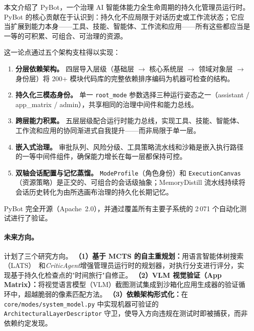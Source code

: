 \documentclass[11pt,a4paper]{article}
\begin{document}
本文介绍了 PyBot，一个治理 AI 智能体能力全生命周期的持久化管理员运行时。
PyBot 的核心贡献在于认识到：持久化不应局限于对话历史或工作流状态；它应当扩展到能力本身——工具、技能、智能体、工作流和应用——所有这些都应当是一等的可积累、可组合、可治理的资源。

这一论点通过五个架构支柱得以实现：

\begin{enumerate}
  \item \textbf{分层依赖架构。}
        四层导入层级（基础层 $\to$ 核心系统层 $\to$ 领域对象层 $\to$ 身份层）将 200+ 模块代码库的完整依赖排序编码为机器可检查的结构。
  \item \textbf{持久化三模态身份。}
        单一 \texttt{root\_mode} 参数选择三种运行姿态之一（assistant / app\_matrix / admin），共享相同的治理中间件和能力总线。
  \item \textbf{跨层能力积累。}
        五层层级配合运行时能力总线，实现工具、技能、智能体、工作流和应用的协同渐进式自我提升——而非局限于单一层。
  \item \textbf{嵌入式治理。}
        审批队列、风险分级、工具策略流水线和沙箱是嵌入执行路径的一等中间件组件，确保能力增长在每一层都保持可控。
  \item \textbf{双轴会话配置与记忆蒸馏。}
        \texttt{ModeProfile}（角色身份）和 \texttt{ExecutionCanvas}（资源策略）是正交的、可组合的会话级抽象；MemoryDistill 流水线持续将会话历史转化为由所选画布治理的持久化长期记忆。
\end{enumerate}

PyBot 完全开源（Apache~2.0），并通过覆盖所有主要子系统的 2\,071 个自动化测试进行了验证。

\paragraph{未来方向。}
计划了三个研究方向。
\textbf{（1）基于 MCTS 的自主重规划：}用语言智能体树搜索（LATS）~\cite{zhou2023lats}和\emph{CriticAgent}增强管理员运行时的规划器，对执行分支进行评分，实现基于持久化检查点的"时间旅行"自修正。
\textbf{（2）VLM 视觉验证（App Matrix）：}将视觉语言模型（VLM）截图测试集成到沙箱化应用生成器的验证循环中，超越脆弱的像素匹配方法。
\textbf{（3）依赖架构形式化：}在 \texttt{core/modes/system\_model.py} 中实现机器可验证的 \texttt{ArchitecturalLayerDescriptor} 守卫，使导入方向违规在测试时即被捕获，而非依赖约定发现。


\end{document}
